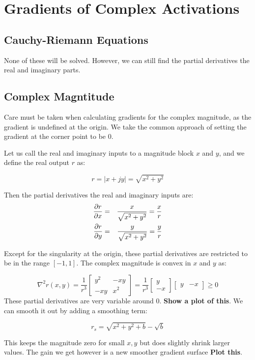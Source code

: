 \section{Gradients of Complex Activations}
\subsection{Cauchy-Riemann Equations}
None of these will be solved. However, we can still find the partial derivatives \wrt the real and
imaginary parts.

\subsection{Complex Magntitude}
Care must be taken when calculating gradients for the complex magnitude, as the
gradient is undefined at the origin. We take the common approach of setting the
gradient at the corner point to be 0. 

Let us call the real and imaginary inputs to a magnitude block $x$ and $y$,
and we define the real output $r$ as:

$$ r = |x + jy| = \sqrt{x^2 + y^2} $$

Then the partial derivatives \wrt the real and imaginary inputs are:
\begin{eqnarray*}
  \frac{\partial r}{\partial x} & = & \frac{x}{\sqrt{x^2 + y^2}} = \frac{x}{r} \\
  \frac{\partial r}{\partial y} & = & \frac{y}{\sqrt{x^2 + y^2}} = \frac{y}{r} \\
\end{eqnarray*}

Except for the singularity at the origin, these partial derivatives are restricted to be in the
range $[-1, 1]$. The complex magnitude is convex in $x$ and $y$ as:

$$\nabla^2 r(x,y) = \frac{1}{r^3} 
\begin{bmatrix}
  y^2 & -xy \\
  -xy & x^2
\end{bmatrix}
 = \frac{1}{r^3} \begin{bmatrix} y \\ -x \end{bmatrix} 
 \begin{bmatrix} y & -x \end{bmatrix} \geq 0 
$$
These partial derivatives are very variable around 0. \textbf{Show a plot of this}. We can smooth it out by
adding a smoothing term:

$$ r_s = \sqrt{x^2 + y^2 + b} - \sqrt{b} $$

This keeps the magnitude zero for small $x,y$ but does slightly shrink larger values. The gain we
get however is a new smoother gradient surface \textbf{Plot this}.
